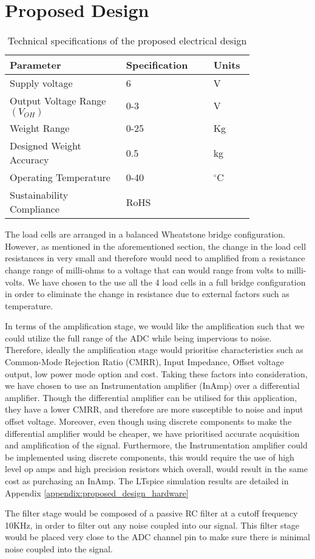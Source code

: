 \section {Proposed Design}
\begin{table}[!ht]
    \centering
    \caption{ Technical specifications of the proposed electrical design}
    \label{tab:hardware_tech_specs}
    \begin{tabular}{|p{0.4\linewidth}|p{0.3\linewidth}| p{0.1\linewidth}|} \hline
        \textbf{Parameter } & \textbf{Specification}  & \textbf{Units}\\ \hline
        Supply voltage & 6 & V \\ \hline
        Output Voltage Range $(V_{OH})$ & 0-3 & V \\ \hline
         Weight Range & 0-25 & Kg \\ \hline
        Designed Weight Accuracy & 0.5 & kg \\ \hline
        Operating Temperature & 0-40 & $^\circ$C \\ \hline
        Sustainability Compliance & RoHS & \\ \hline
    \end{tabular}

\end{table}

The load cells are arranged in a balanced Wheatstone bridge configuration. However, as mentioned in the aforementioned section, the change in the load cell resistances in very small and therefore would need to amplified from a resistance change range of milli-ohms to a voltage that can would range from volts to milli-volts. We have chosen to the use all the 4 load cells in a full bridge configuration in order to eliminate the change in resistance due to external factors such as temperature.

In terms of the amplification stage, we would like the amplification such that we could utilize the full range of the ADC while being impervious to noise. Therefore, ideally the amplification stage would prioritise characteristics such as Common-Mode Rejection Ratio (CMRR), Input Impedance, Offset voltage output, low power mode option and cost. Taking these factors into consideration, we have chosen to use an Instrumentation amplifier (InAmp) over a differential amplifier. Though the differential amplifier can be utilised for this application, they have a lower CMRR, and therefore are more susceptible to noise and input offset voltage. Moreover, even though using discrete components to make the differential amplifier would be cheaper, we have prioritised accurate acquisition and amplification of the signal.
Furthermore, the Instrumentation amplifier could be implemented using discrete components, this would require the use of high level op amps and high precision resistors which overall, would result in the same cost as purchasing an InAmp. The LTspice simulation results are detailed in Appendix \ref{appendix:proposed_design_hardware}

The filter stage would be composed of a passive RC filter at a cutoff frequency 10KHz, in order to filter out any noise coupled into our signal. This filter stage would be placed very close to the ADC channel pin to make sure there is minimal noise coupled into the signal.